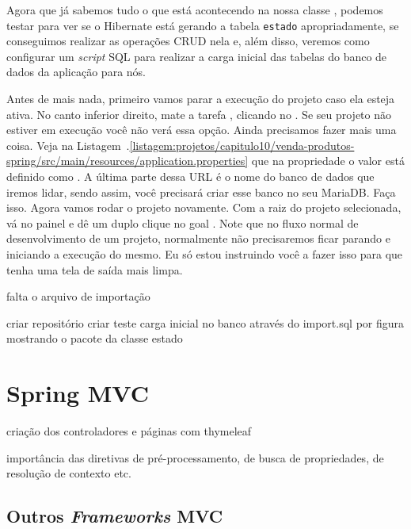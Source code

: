 Agora que já sabemos tudo o que está acontecendo na nossa classe , podemos testar para ver se o Hibernate está gerando a tabela \texttt{estado} apropriadamente, se conseguimos realizar as operações CRUD nela e, além disso, veremos como configurar um \textit{script} SQL para realizar a carga inicial das tabelas do banco de dados da aplicação para nós.

Antes de mais nada, primeiro vamos parar a execução do projeto caso ela esteja ativa. No canto inferior direito, mate a tarefa , clicando no . Se seu projeto não estiver em execução você não verá essa opção. Ainda precisamos fazer mais uma coisa. Veja na Listagem~\thechapter.\ref{listagem:projetos/capitulo10/venda-produtos-spring/src/main/resources/application.properties} que na propriedade  o valor está definido como . A última parte dessa URL é o nome do banco de dados que iremos lidar, sendo assim, você precisará criar esse banco no seu MariaDB. Faça isso.
Agora vamos rodar o projeto novamente. Com a raiz do projeto selecionada, vá no painel  e dê um duplo clique no goal . Note que no fluxo normal de desenvolvimento de um projeto, normalmente não precisaremos ficar parando e iniciando a execução do mesmo. Eu só estou instruindo você a fazer isso para que tenha uma tela de saída mais limpa.

falta o arquivo de importação

criar repositório
criar teste
carga inicial no banco através do import.sql
por figura mostrando o pacote da classe estado

\section{Spring MVC}

criação dos controladores e páginas com thymeleaf

importância das diretivas de pré-processamento, de busca de propriedades, de resolução de contexto etc.

\subsection{Outros \textit{Frameworks} MVC}

